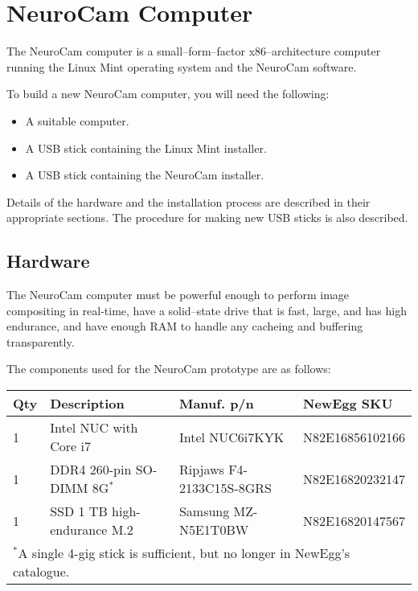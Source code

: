 
\chapter{NeuroCam Computer}
\label{machine}

The NeuroCam computer is a small--form--factor x86--architecture computer
running the Linux Mint operating system and the NeuroCam software.

To build a new NeuroCam computer, you will need the following:
\begin{itemize}
%
\item A suitable computer.
\item A USB stick containing the Linux Mint installer.
\item A USB stick containing the NeuroCam installer.
%
\end{itemize}

Details of the hardware and the installation process are described in their
appropriate sections. The procedure for making new USB sticks is also
described.

%
%
%
\section{Hardware}

The NeuroCam computer must be powerful enough to perform image compositing
in real-time, have a solid--state drive that is fast, large, and has high
endurance, and have enough RAM to handle any cacheing and buffering
transparently.

The components used for the NeuroCam prototype are as follows:

\begin{tabular}{llll}\hline
Qty & Description & Manuf. p/n & NewEgg SKU \\
\hline
%
1 & Intel NUC with Core i7 & Intel NUC6i7KYK & N82E16856102166 \\
1 & DDR4 260-pin SO-DIMM 8G$^*$ & Ripjaws F4-2133C15S-8GRS & N82E16820232147 \\
1 & SSD 1 TB high-endurance M.2 & Samsung MZ-N5E1T0BW & N82E16820147567 \\
%
\hline
\multicolumn{4}{l}{$^*$A single 4-gig stick is sufficient, but no longer in
NewEgg's catalogue.} \\
\end{tabular}

